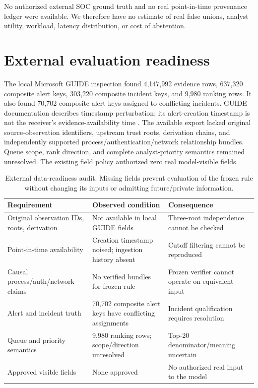 No authorized external SOC ground truth and no real point-in-time provenance ledger were available. We therefore have no estimate of real false unions, analyst utility, workload, latency distribution, or cost of abstention.



\section{External evaluation readiness}
The local Microsoft GUIDE inspection found 4,147,992 evidence rows, 637,320 composite alert keys, 303,220 composite incident keys, and 9,980 ranking rows. It also found 70,702 composite alert keys assigned to conflicting incidents. GUIDE documentation describes timestamp perturbation; its alert-creation timestamp is not the receiver's evidence-availability time \cite{guide2024}. The available export lacked original source-observation identifiers, upstream trust roots, derivation chains, and independently supported process/authentication/network relationship bundles. Queue scope, rank direction, and complete analyst-priority semantics remained unresolved. The existing field policy authorized zero real model-visible fields.

\begin{table}[t]\centering\footnotesize\caption{External data-readiness audit. Missing fields prevent evaluation of the frozen rule without changing its inputs or admitting future/private information.}\label{tab:readiness}\begin{tabularx}{\textwidth}{@{}p{}Y Y@{}}\toprule Requirement & Observed condition & Consequence\\\midrule Original observation IDs, roots, derivation & Not available in local GUIDE fields & Three-root independence cannot be checked\\ Point-in-time availability & Creation timestamp noised; ingestion history absent & Cutoff filtering cannot be reproduced\\ Causal process/auth/network claims & No verified bundles for frozen rule & Frozen verifier cannot operate on equivalent input\\ Alert and incident truth & 70,702 composite alert keys have conflicting assignments & Incident qualification requires resolution\\ Queue and priority semantics & 9,980 ranking rows; scope/direction unresolved & Top-20 denominator/meaning uncertain\\ Approved visible fields & None approved & No authorized real input to the model\\\bottomrule\end{tabularx}\end{table}

